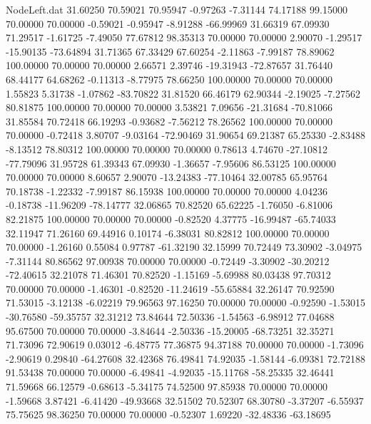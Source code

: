 \begin{filecontents}{NodeLeft.dat}
  31.60250   70.59021   70.95947    -0.97263   -7.31144   74.17188   99.15000   70.00000   70.00000   -0.59021   -0.95947   -8.91288  -66.99969
  31.66319   67.09930   71.29517    -1.61725   -7.49050   77.67812   98.35313   70.00000   70.00000    2.90070   -1.29517  -15.90135  -73.64894
  31.71365   67.33429   67.60254    -2.11863   -7.99187   78.89062  100.00000   70.00000   70.00000    2.66571    2.39746  -19.31943  -72.87657
  31.76440   68.44177   64.68262    -0.11313   -8.77975   78.66250  100.00000   70.00000   70.00000    1.55823    5.31738   -1.07862  -83.70822
  31.81520   66.46179   62.90344    -2.19025   -7.27562   80.81875  100.00000   70.00000   70.00000    3.53821    7.09656  -21.31684  -70.81066
  31.85584   70.72418   66.19293    -0.93682   -7.56212   78.26562  100.00000   70.00000   70.00000   -0.72418    3.80707   -9.03164  -72.90469
  31.90654   69.21387   65.25330    -2.83488   -8.13512   78.80312  100.00000   70.00000   70.00000    0.78613    4.74670  -27.10812  -77.79096
  31.95728   61.39343   67.09930    -1.36657   -7.95606   86.53125  100.00000   70.00000   70.00000    8.60657    2.90070  -13.24383  -77.10464
  32.00785   65.95764   70.18738    -1.22332   -7.99187   86.15938  100.00000   70.00000   70.00000    4.04236   -0.18738  -11.96209  -78.14777
  32.06865   70.82520   65.62225    -1.76050   -6.81006   82.21875  100.00000   70.00000   70.00000   -0.82520    4.37775  -16.99487  -65.74033
  32.11947   71.26160   69.44916     0.10174   -6.38031   80.82812  100.00000   70.00000   70.00000   -1.26160    0.55084    0.97787  -61.32190
  32.15999   70.72449   73.30902    -3.04975   -7.31144   80.86562   97.00938   70.00000   70.00000   -0.72449   -3.30902  -30.20212  -72.40615
  32.21078   71.46301   70.82520    -1.15169   -5.69988   80.03438   97.70312   70.00000   70.00000   -1.46301   -0.82520  -11.24619  -55.65884
  32.26147   70.92590   71.53015    -3.12138   -6.02219   79.96563   97.16250   70.00000   70.00000   -0.92590   -1.53015  -30.76580  -59.35757
  32.31212   73.84644   72.50336    -1.54563   -6.98912   77.04688   95.67500   70.00000   70.00000   -3.84644   -2.50336  -15.20005  -68.73251
  32.35271   71.73096   72.90619     0.03012   -6.48775   77.36875   94.37188   70.00000   70.00000   -1.73096   -2.90619    0.29840  -64.27608
  32.42368   76.49841   74.92035    -1.58144   -6.09381   72.72188   91.53438   70.00000   70.00000   -6.49841   -4.92035  -15.11768  -58.25335
  32.46441   71.59668   66.12579    -0.68613   -5.34175   74.52500   97.85938   70.00000   70.00000   -1.59668    3.87421   -6.41420  -49.93668
  32.51502   70.52307   68.30780    -3.37207   -6.55937   75.75625   98.36250   70.00000   70.00000   -0.52307    1.69220  -32.48336  -63.18695

\end{filecontents}
